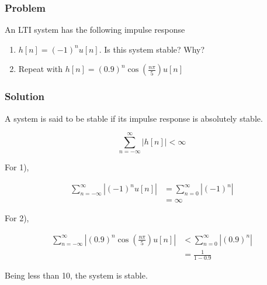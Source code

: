 \subsubsection{Problem}
An LTI system has the following impulse response
\begin{enumerate}
    \item $h[n] = (-1)^n u[n]$. Is this system stable? Why?
    \item Repeat with $h[n] = (0.9)^n \cos \left( \frac{n \pi}{5} \right) u[n]$
\end{enumerate}
\subsubsection{Solution}

A system is said to be stable if its impulse response is absolutely stable.

\begin{equation}
    \sum\limits_{n =  - \infty }^\infty  {\left| {h[n]} \right|}  < \infty 
\end{equation}

For 1), 

\begin{equation}
    \begin{aligned}
        \sum\limits_{n =  - \infty }^\infty  {\left| {{{( - 1)}^n}u[n]} \right|}  &= \sum\limits_{n = 0}^\infty  {\left| {{{( - 1)}^n}} \right|} \\
         &= \infty 
        \end{aligned}
\end{equation}

For 2),

\begin{equation}
    \begin{aligned}
            \sum\limits_{n =  - \infty }^\infty  {\left| {{{(0.9)}^n}\cos \left( {\frac{{n\pi }}{5}} \right)u[n]} \right|}  &< \sum\limits_{n = 0}^\infty  {\left| {{{(0.9)}^n}} \right|} \\
             &= \frac{1}{{1 - 0.9}}
        \end{aligned}
\end{equation}

Being less than 10, the system is stable.

